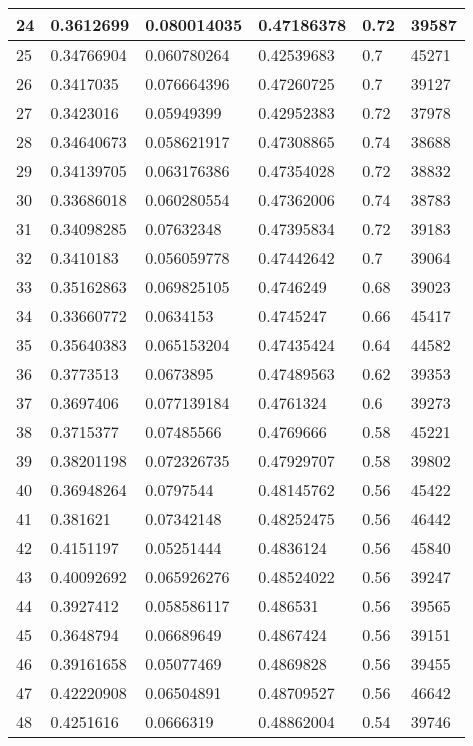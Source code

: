\begin{longtable}{|l|l|l|l|l|l|}
24 & 0.3612699 & 0.080014035 & 0.47186378 & 0.72 & 39587 \\ \hline 
25 & 0.34766904 & 0.060780264 & 0.42539683 & 0.7 & 45271 \\ \hline 
26 & 0.3417035 & 0.076664396 & 0.47260725 & 0.7 & 39127 \\ \hline 
27 & 0.3423016 & 0.05949399 & 0.42952383 & 0.72 & 37978 \\ \hline 
28 & 0.34640673 & 0.058621917 & 0.47308865 & 0.74 & 38688 \\ \hline 
29 & 0.34139705 & 0.063176386 & 0.47354028 & 0.72 & 38832 \\ \hline 
30 & 0.33686018 & 0.060280554 & 0.47362006 & 0.74 & 38783 \\ \hline 
31 & 0.34098285 & 0.07632348 & 0.47395834 & 0.72 & 39183 \\ \hline 
32 & 0.3410183 & 0.056059778 & 0.47442642 & 0.7 & 39064 \\ \hline 
33 & 0.35162863 & 0.069825105 & 0.4746249 & 0.68 & 39023 \\ \hline 
34 & 0.33660772 & 0.0634153 & 0.4745247 & 0.66 & 45417 \\ \hline 
35 & 0.35640383 & 0.065153204 & 0.47435424 & 0.64 & 44582 \\ \hline 
36 & 0.3773513 & 0.0673895 & 0.47489563 & 0.62 & 39353 \\ \hline 
37 & 0.3697406 & 0.077139184 & 0.4761324 & 0.6 & 39273 \\ \hline 
38 & 0.3715377 & 0.07485566 & 0.4769666 & 0.58 & 45221 \\ \hline 
39 & 0.38201198 & 0.072326735 & 0.47929707 & 0.58 & 39802 \\ \hline 
40 & 0.36948264 & 0.0797544 & 0.48145762 & 0.56 & 45422 \\ \hline 
41 & 0.381621 & 0.07342148 & 0.48252475 & 0.56 & 46442 \\ \hline 
42 & 0.4151197 & 0.05251444 & 0.4836124 & 0.56 & 45840 \\ \hline 
43 & 0.40092692 & 0.065926276 & 0.48524022 & 0.56 & 39247 \\ \hline 
44 & 0.3927412 & 0.058586117 & 0.486531 & 0.56 & 39565 \\ \hline 
45 & 0.3648794 & 0.06689649 & 0.4867424 & 0.56 & 39151 \\ \hline 
46 & 0.39161658 & 0.05077469 & 0.4869828 & 0.56 & 39455 \\ \hline 
47 & 0.42220908 & 0.06504891 & 0.48709527 & 0.56 & 46642 \\ \hline 
48 & 0.4251616 & 0.0666319 & 0.48862004 & 0.54 & 39746 \\ \hline 

\end{longtable}
